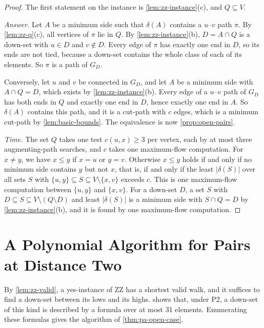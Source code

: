 \documentclass[pdflatex,sn-mathphys-num]{sn-jnl}%
\theoremstyle{thmstyleone}%
\theoremstyle{thmstyletwo}%
\theoremstyle{thmstylethree}%
\begin{document}
\begin{proof}
The first statement on the instance is \cref{lem:zz-instance}(c), and $Q \subseteq V$.

\emph{Answer.}
Let $A$ be a minimum side such that $\delta(A)$ contains a $u$--$v$ path $\pi$.
By \cref{lem:zz-q}(c), all vertices of $\pi$ lie in $Q$.
By \cref{lem:zz-instance}(b), $D = A \cap Q$ is a down-set with $u \in D$ and $v \notin D$.
Every edge of $\pi$ has exactly one end in $D$, so its ends are not tied, because a down-set contains the whole class of each of its elements.
So $\pi$ is a path of $G_D$.

Conversely, let $u$ and $v$ be connected in $G_D$, and let $A$ be a minimum side with $A \cap Q = D$, which exists by \cref{lem:zz-instance}(b).
Every edge of a $u$--$v$ path of $G_D$ has both ends in $Q$ and exactly one end in $D$, hence exactly one end in $A$.
So $\delta(A)$ contains this path, and it is a cut-path with $c$ edges, which is a minimum cut-path by \cref{lem:basic-bounds}.
The equivalence is now \cref{prop:open-pairs}.

\emph{Time.}
The set $Q$ takes one test $c(u, x) \geq 3$ per vertex, each by at most three augmenting-path searches, and $c$ takes one maximum-flow computation.
For $x \neq y$, we have $x \leq y$ if $x = u$ or $y = v$.
Otherwise $x \leq y$ holds if and only if no minimum side contains $y$ but not $x$, that is, if and only if the least $|\delta(S)|$ over all sets $S$ with $\{u, y\} \subseteq S \subseteq V \setminus \{x, v\}$ exceeds $c$.
This is one maximum-flow computation between $\{u, y\}$ and $\{x, v\}$.
For a down-set $D$, a set $S$ with $D \subseteq S \subseteq V \setminus (Q \setminus D)$ and least $|\delta(S)|$ is a minimum side with $S \cap Q = D$ by \cref{lem:zz-instance}(b), and it is found by one maximum-flow computation.
\end{proof}

\section{A Polynomial Algorithm for Pairs at Distance Two}
\label{sec:pa-polynomial}

By \cref{lem:zz-valid}, a yes-instance of ZZ has a shortest valid walk, and it suffices to find a down-set between its lows and its highs.
 shows that, under P2, a down-set of this kind is described by a formula over at most 31 elements.
Enumerating these formulas gives the algorithm of \cref{thm:pa-open-case}.
\end{document}
